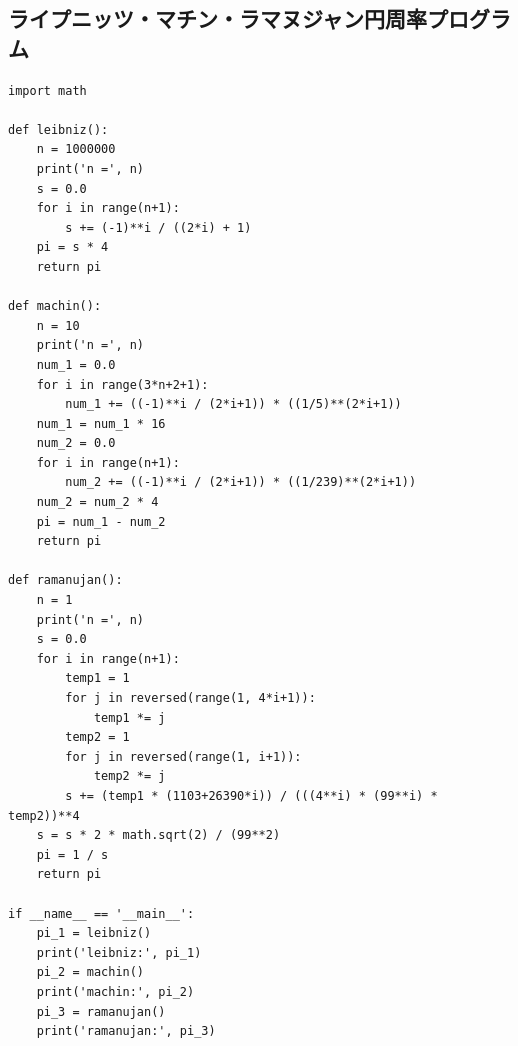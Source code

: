 \documentclass[a4paper, titlepage]{jsarticle}
\begin{document}
	\subsection{ライプニッツ・マチン・ラマヌジャン円周率プログラム}
		\begin{lstlisting}
import math

def leibniz():
    n = 1000000
    print('n =', n)
    s = 0.0
    for i in range(n+1):
        s += (-1)**i / ((2*i) + 1)
    pi = s * 4
    return pi

def machin():
    n = 10
    print('n =', n)
    num_1 = 0.0
    for i in range(3*n+2+1):
        num_1 += ((-1)**i / (2*i+1)) * ((1/5)**(2*i+1))
    num_1 = num_1 * 16
    num_2 = 0.0
    for i in range(n+1):
        num_2 += ((-1)**i / (2*i+1)) * ((1/239)**(2*i+1))
    num_2 = num_2 * 4
    pi = num_1 - num_2
    return pi

def ramanujan():
    n = 1
    print('n =', n)
    s = 0.0
    for i in range(n+1):
        temp1 = 1
        for j in reversed(range(1, 4*i+1)):
            temp1 *= j
        temp2 = 1
        for j in reversed(range(1, i+1)):
            temp2 *= j
        s += (temp1 * (1103+26390*i)) / (((4**i) * (99**i) * temp2))**4
    s = s * 2 * math.sqrt(2) / (99**2)
    pi = 1 / s
    return pi

if __name__ == '__main__':
    pi_1 = leibniz()
    print('leibniz:', pi_1)
    pi_2 = machin()
    print('machin:', pi_2)
    pi_3 = ramanujan()
    print('ramanujan:', pi_3)
		\end{lstlisting}
\end{document}
